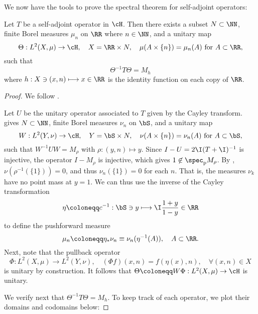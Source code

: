 \documentclass[oneside,reqno,letterpaper]{amsart}
\newcommand{\pspec}{\spec_{\mathrm{p}}}
\begin{document}
We now have the tools to prove the spectral theorem for self-adjoint operators:
\begin{theorem}
\label{thm:spectral-thm-self-adjoint}
  Let \(T\) be a self-adjoint operator in \(\cH\). 
  Then there exists a subset \(N \subset \NN\), finite Borel measures \(\mu_n\) on \(\RR\) where \(n \in \NN\), and a unitary map  
  \[
    \Theta: L^2(X, \mu) \to \cH, \quad X = \RR \times N, \quad \mu(A \times \{n\}) = \mu_n(A) \text{ for } A \subset \RR , 
  \] 
  such that 
  \[
    \Theta^{-1} T \Theta = M_{h}
  \]
  where \(h: X \ni (x, n) \longmapsto x \in \RR\) is the identity function on each copy of \(\RR\). 
\end{theorem}
\begin{proof}
  We follow \cite{pankrashkin2022spectral}. 
  
  Let \(U\) be the unitary operator associated to \(T\) given by the Cayley transform. 
   gives \(N \subset \NN\), finite Borel measures \(\nu_n\) on \(\bS\), and a unitary map 
  \[
    W: L^2(Y, \nu) \to \cH, \quad Y = \bS \times N, \quad \nu(A \times \{n\}) = \nu_n(A) \text{ for } A \subset \bS, 
  \] 
  such that \(W^{-1} U W = M_{\rho}\) with \(\rho: (y, n) \mapsto y\). 
  Since \(I - U = 2\I (T + \I)^{-1}\) is injective, the operator \(I - M_{\rho}\) is injective, which gives \(1 \not\in  \pspec M_{\rho}\). 
  By , \(\nu(\rho^{-1}(\{1\})) = 0\), and thus \(\nu_n(\{1\}) = 0\) for each \(n\). 
  That is, the measures \(\nu_k\) have no point mass at \(y = 1\).
  We can thus use the inverse of the Cayley transformation
  \[
    \eta \coloneqq c^{-1}: \bS \ni y \longmapsto \I \frac{1 + y}{1 - y} \in \RR 
  \] 
  to define the pushforward measure \[
    \mu_n \coloneqq \eta_* \nu_n \equiv \nu_n(\eta^{-1}(A)), \quad A \subset \RR . 
  \] 
  Next, note that the pullback operator
  \[
    \Phi: L^2(X, \mu) \to L^2(Y, \nu), \quad (\Phi f)(x, n) = f(\eta(x), n), \quad \forall (x, n) \in X
  \] 
  is unitary by construction. It follows that \(\Theta \coloneqq W\Phi: L^2(X, \mu) \to \cH\) is unitary. 

  We verify next that \(\Theta^{-1} T \Theta = M_{h}\). 
  To keep track of each operator, we plot their domains and codomains below:
  


\end{proof}
\end{document}
